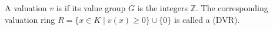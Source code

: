 A valuation $v$ is  if its value group $G$ is the integers $\mathbb{Z}$. The corresponding valuation ring $R = \{x \in K \mid v(x) \geq 0\} \cup \{0\}$ is called a  (DVR).
